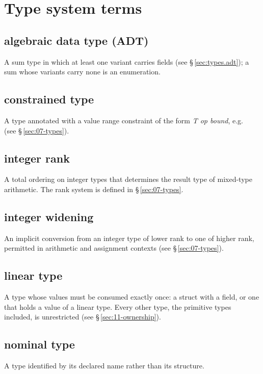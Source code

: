 \section{Type system terms}
\label{sec:terms.types}

\subsection*{algebraic data type (ADT)}
A sum type in which at least one variant carries fields (see
\S\,\ref{sec:types.adt}); a sum whose variants carry none is an enumeration.

\subsection*{constrained type}
A type annotated with a value range constraint of the form
\textit{T op bound}, e.g.\ 
(see \S\,\ref{sec:07-types}).

\subsection*{integer rank}
A total ordering on integer types that determines the result type of
mixed-type arithmetic.  The rank system is defined in
\S\,\ref{sec:07-types}.

\subsection*{integer widening}
An implicit conversion from an integer type of lower rank to one of
higher rank, permitted in arithmetic and assignment contexts
(see \S\,\ref{sec:07-types}).

\subsection*{linear type}
A type whose values must be consumed exactly once: a struct with a  field, or
one that holds a value of a linear type.  Every other type, the primitive types included,
is unrestricted (see \S\,\ref{sec:11-ownership}).

\subsection*{nominal type}
A type identified by its declared name rather than its structure.

